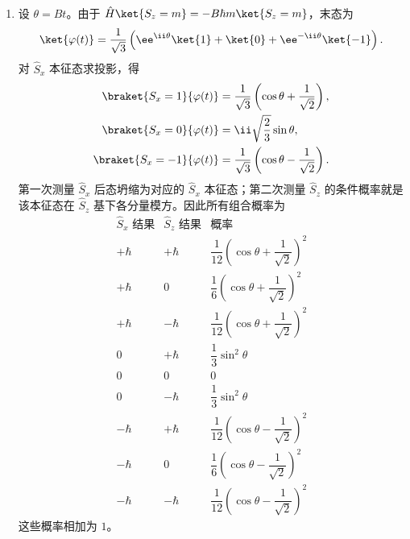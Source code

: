 \begin{question}[共 30 分]
\begin{solution}
\begin{enumerate}
\[\begin{pmatrix}
  0&0&1
  \end{pmatrix},
  \]
  所以
  因此
  \[
  \sigma_{S_y}^2=\frac{\hbar^2}{3},
  \qquad
  \sigma_{S_z}^2=\frac{2\hbar^2}{3}.
  \]
  又 $[\hat S_y,\hat S_z]=\ii\hbar\hat S_x$，故
  \[
  \frac14\left|\ev{[\hat S_y,\hat S_z]}\right|^2
  =\frac14\hbar^2\left(\frac{2\sqrt2}{3}\hbar\right)^2
  =\frac{2\hbar^4}{9}
  =\sigma_{S_y}^2\sigma_{S_z}^2.
  \]
  不确定度关系取等号。
  \item 设 $\theta=Bt$。由于 $\hat H\ket{S_z=m}=-B\hbar m\ket{S_z=m}$，末态为
  \[
  \ket{\varphi(t)}=\frac{1}{\sqrt3}\left(\ee^{\ii\theta}\ket{1}+\ket{0}+\ee^{-\ii\theta}\ket{-1}\right).
  \]
  对 $\hat S_x$ 本征态求投影，得
  \[
  \begin{aligned}
  \braket{S_x=1}{\varphi(t)}&=\frac{1}{\sqrt3}\left(\cos\theta+\frac{1}{\sqrt2}\right),\\
  \braket{S_x=0}{\varphi(t)}&=\ii\sqrt{\frac23}\sin\theta,\\
  \braket{S_x=-1}{\varphi(t)}&=\frac{1}{\sqrt3}\left(\cos\theta-\frac{1}{\sqrt2}\right).
  \end{aligned}
  \]
  第一次测量 $\hat S_x$ 后态坍缩为对应的 $\hat S_x$ 本征态；第二次测量 $\hat S_z$ 的条件概率就是该本征态在 $\hat S_z$ 基下各分量模方。因此所有组合概率为
  \[
  \begin{array}{c|c|c}
  \hat S_x\text{ 结果} & \hat S_z\text{ 结果} & \text{概率}\\ \hline
  +\hbar & +\hbar & \dfrac{1}{12}\left(\cos\theta+\dfrac{1}{\sqrt2}\right)^2\\[1ex]
  +\hbar & 0 & \dfrac{1}{6}\left(\cos\theta+\dfrac{1}{\sqrt2}\right)^2\\[1ex]
  +\hbar & -\hbar & \dfrac{1}{12}\left(\cos\theta+\dfrac{1}{\sqrt2}\right)^2\\[1ex]
  0 & +\hbar & \dfrac{1}{3}\sin^2\theta\\[1ex]
  0 & 0 & 0\\[1ex]
  0 & -\hbar & \dfrac{1}{3}\sin^2\theta\\[1ex]
  -\hbar & +\hbar & \dfrac{1}{12}\left(\cos\theta-\dfrac{1}{\sqrt2}\right)^2\\[1ex]
  -\hbar & 0 & \dfrac{1}{6}\left(\cos\theta-\dfrac{1}{\sqrt2}\right)^2\\[1ex]
  -\hbar & -\hbar & \dfrac{1}{12}\left(\cos\theta-\dfrac{1}{\sqrt2}\right)^2
  \end{array}
  \]
  这些概率相加为 $1$。
\end{enumerate}
\end{solution}
\end{question}

